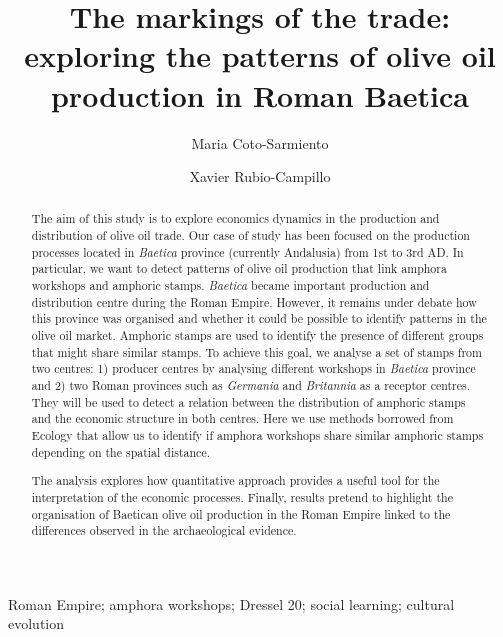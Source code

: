 \documentclass[review]{elsarticle}
\begin{document}
\begin{frontmatter}

\title{The markings of the trade: exploring the patterns of olive oil production in Roman Baetica}

\author[ceipacadress]{Maria Coto-Sarmiento}


\author[edadress]{Xavier Rubio-Campillo}

\address[edadress]{School of History, Classic \& Archaeology, Room OOM.33, William Robertson Wing, Old Medical School, Teviot Place, University of Edinburgh, UK}
\address[ceipacadress]{CEIPAC, Department of Prehistory and Archaeology, Montalegre, 6-8, 08001, University of Barcelona, Barcelona, Spain}

\begin{keyword}
Roman Empire; amphora workshops; Dressel 20; social learning; cultural evolution
\end{keyword}



\begin{abstract}

The aim of this study is to explore economics dynamics in the production and distribution of olive oil trade. 
Our case of study has been focused on the production processes located in \textit{Baetica} province (currently Andalusia) from 1st to 3rd AD. In particular, we want to detect patterns of olive oil production that link amphora workshops and amphoric stamps. \textit{Baetica} became important production and distribution centre during the Roman Empire. However, it remains under debate how this province was organised and whether it could be possible to identify patterns in the olive oil market. Amphoric stamps are used to identify the presence of different groups that might share similar stamps. To achieve this goal, we analyse a set of stamps from two centres: 1) producer centres by analysing different workshops in \textit{Baetica} province and 2) two Roman provinces such as \textit{Germania} and \textit{Britannia} as a receptor centres. They will be used to detect a relation between the distribution of amphoric stamps and the economic structure in both centres. Here we use methods borrowed from Ecology that allow us to identify if amphora workshops share similar amphoric stamps depending on the spatial distance. 

The analysis explores how quantitative approach provides a useful tool for the interpretation of the economic processes. Finally, results pretend to highlight the organisation of Baetican olive oil production in the Roman Empire linked to the differences observed in the archaeological evidence.

\end{abstract}


\end{frontmatter}
\end{document}
